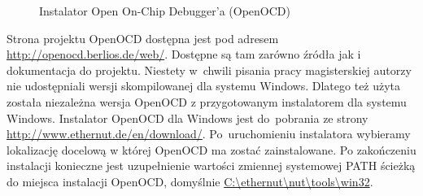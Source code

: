 \begin{figure}[h!]
 \centering
 \hfill
 \caption{Instalator Open On-Chip Debugger'a (OpenOCD)}
 \label{fig:openocd-win32-install}
\end{figure}

Strona projektu OpenOCD dostępna jest pod adresem
\url{http://openocd.berlios.de/web/}. Dostępne są tam zarówno źródła jak i
dokumentacja do projektu. Niestety w~chwili pisania pracy magisterskiej autorzy
nie udostępniali wersji skompilowanej dla systemu Windows. Dlatego też użyta
została niezależna wersja OpenOCD z przygotowanym instalatorem dla systemu
Windows. Instalator OpenOCD dla Windows jest do~pobrania ze strony
\url{http://www.ethernut.de/en/download/}. Po~uruchomieniu instalatora wybieramy
lokalizację docelową w której OpenOCD ma zostać zainstalowane. Po zakończeniu
instalacji konieczne jest uzupełnienie wartości zmiennej systemowej PATH ścieżką
do miejsca instalacji OpenOCD, domyślnie \url{C:\ethernut\nut\tools\win32}.

